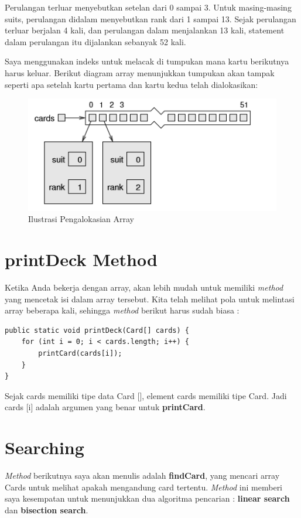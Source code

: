 \noindent Perulangan terluar menyebutkan setelan dari 0 sampai 3. Untuk masing-masing suits, perulangan didalam menyebutkan rank dari 1 sampai 13. Sejak perulangan terluar berjalan 4 kali, dan perulangan dalam menjalankan 13 kali, statement dalam perulangan itu dijalankan sebanyak 52 kali.

\noindent Saya menggunakan indeks untuk melacak di tumpukan mana kartu berikutnya harus keluar. Berikut diagram array menunjukkan tumpukan akan tampak seperti apa setelah kartu pertama dan kartu kedua telah dialokasikan:
\begin{figure}[h!]
\centering
\includegraphics[scale=0.7]{array_in_for.png}
\caption{Ilustrasi Pengalokasian Array}
\label{fig:univerise4}
\end{figure}

\section{printDeck Method}
Ketika Anda bekerja dengan array, akan lebih mudah untuk memiliki \textit{method} yang mencetak isi dalam array tersebut. Kita telah melihat pola untuk melintasi array beberapa kali, sehingga \textit{method} berikut harus sudah biasa :
\begin{lstlisting}
public static void printDeck(Card[] cards) { 
    for (int i = 0; i < cards.length; i++) { 
        printCard(cards[i]); 
    } 
}
\end{lstlisting}

\noindent Sejak cards memiliki tipe data Card [], element cards memiliki tipe Card. Jadi cards [i] adalah argumen yang benar untuk \textbf{printCard}.

\section{Searching}
\textit{Method} berikutnya saya akan menulis adalah \textbf{findCard}, yang mencari array Cards untuk melihat apakah mengandung card tertentu. \textit{Method} ini memberi saya kesempatan untuk menunjukkan dua algoritma pencarian : \textbf{linear search} dan \textbf{bisection search}.

